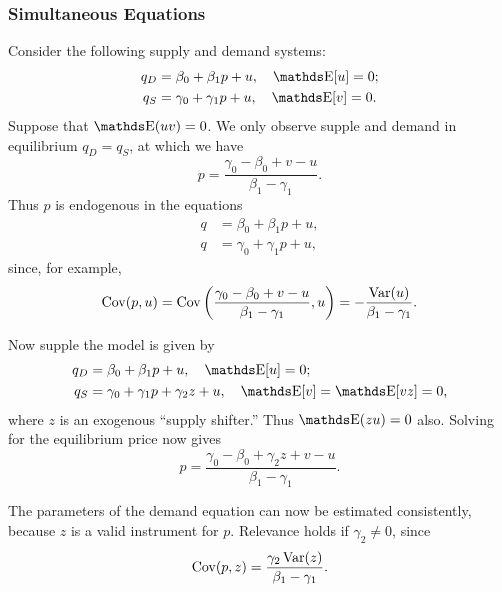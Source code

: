 \documentclass[letterpaper, 10pt]{article}
\begin{document}
\subsubsection{Simultaneous Equations}
\begin{example}
  Consider the following supply and demand systems:
  \begin{align*}
    q_D
    &= \beta_0 + \beta_1 p + u, \quad \E[u] = 0; \\
    q_S
    &= \gamma_0 + \gamma_1 p + u, \quad \E[v] = 0.
  \end{align*}
  Suppose that \(\E(uv) = 0\).
  We only observe supple and demand in equilibrium \(q_D = q_S\), at which we have
  \[
    p = \frac{\gamma_0 - \beta_0 + v - u}{\beta_1 - \gamma_1}.
  \]
  Thus \(p\) is endogenous in the equations
  \begin{align*}
    q &= \beta_0 + \beta_1 p + u, \\
    q &= \gamma_0 + \gamma_1 p + u,
  \end{align*}
  since, for example,
  \[
    \operatorname{Cov}(p, u)
    = \operatorname{Cov}\left(
      \frac{\gamma_0 - \beta_0 + v - u}{\beta_1 - \gamma_1}, u
    \right)
    = - \frac{\operatorname{Var}(u)}{\beta_1 - \gamma_1}.
  \]

  Now supple the model is given by
  \begin{align*}
    q_D
    &= \beta_0 + \beta_1 p + u, \quad \E[u] = 0; \\
    q_S
    &= \gamma_0 + \gamma_1 p + \gamma_2 z + u, \quad \E[v] = \E[vz] = 0,
  \end{align*}
  where \(z\) is an exogenous ``supply shifter.''
  Thus \(\E(zu) = 0\) also.
  Solving for the equilibrium price now gives
  \[
    p
    = \frac{\gamma_0 - \beta_0 + \gamma_2 z + v - u}{\beta_1 - \gamma_1}.
  \]

  The parameters of the demand equation can now be estimated consistently, because \(z\) is a valid instrument for \(p\).
  Relevance holds if \(\gamma_2 \neq 0\), since
  \[
    \operatorname{Cov}(p, z)
    = \frac{\gamma_2 \operatorname{Var}(z)}{\beta_1 - \gamma_1}.
  \]
\end{example}
\end{document}
